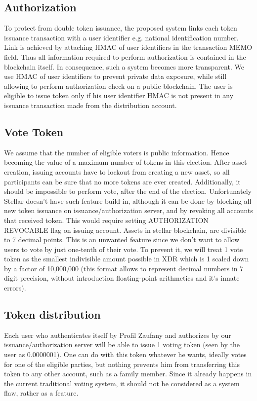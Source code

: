 \documentclass[runningheads]{llncs}
\begin{document}
\subsection{Authorization}
To protect from double token issuance, the proposed system links each token issuance transaction with a user identifier e.g. national identification number. Link is achieved by attaching HMAC of user identifiers in the transaction MEMO field. Thus all information required to perform authorization is contained in the blockchain itself. In consequence, such a system becomes more transparent. We use HMAC of user identifiers to prevent private data exposure, while still allowing to perform authorization check on a public blockchain. The user is eligible to issue token only if his user identifier HMAC is not present in any issuance transaction made from the distribution account.

\subsection{Vote Token}
We assume that the number of eligible voters is public information. Hence becoming the value of a maximum number of tokens in this election. After asset creation, issuing accounts have to lockout from creating a new asset, so all participants can be sure that no more tokens are ever created. Additionally, it should be impossible to perform vote, after the end of the election. Unfortunately Stellar doesn’t have such feature build-in, although it can be done by blocking all new token issuance on issuance/authorization server, and by revoking all accounts that received token. This would require setting AUTHORIZATION REVOCABLE flag on issuing account.
Assets in stellar blockchain, are divisible to 7 decimal points. This is an unwanted feature since we don’t want to allow users to vote by just one-tenth of their vote. To prevent it, we will treat 1 vote token as the smallest indivisible amount possible in XDR which is 1 scaled down by a factor of 10,000,000 (this format allows to represent decimal numbers in 7 digit precision, without introduction floating-point arithmetics and it’s innate errors).

\subsection{Token distribution}
Each user who authenticates itself by Profil Zaufany and authorizes by our issuance/authorization server will be able to issue 1 voting token (seen by the user as 0.0000001). One can do with this token whatever he wants, ideally votes for one of the eligible parties, but nothing prevents him from transferring this token to any other account, such as a family member. Since it already happens in the current traditional voting system, it should not be considered as a system flaw, rather as a feature.
\end{document}
